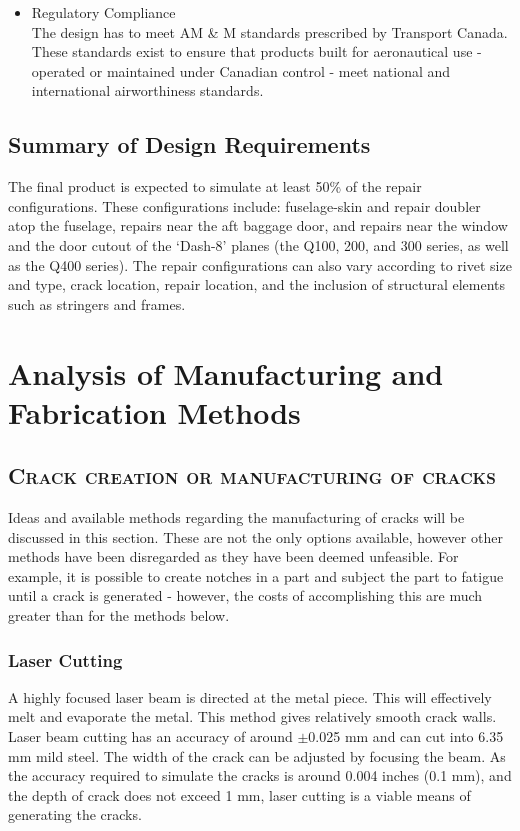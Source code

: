 \documentclass[12pt]{article}
\begin{document}
\begin{itemize}
\item Regulatory Compliance \hfill \\
The design has to meet AM \& M standards prescribed by Transport Canada. These standards exist to ensure that products built for aeronautical use - operated or maintained under Canadian control - meet national and international airworthiness standards.

\end{itemize}
\subsection{Summary of Design Requirements}

The final product is expected to simulate at least 50\% of the repair configurations. These configurations include: fuselage-skin and repair doubler atop the fuselage, repairs near the aft baggage door, and repairs near the window and the door cutout of the `Dash-8' planes (the Q100, 200, and 300 series, as well as the Q400 series). The repair configurations can also vary according to rivet size and type, crack location, repair location, and the inclusion of structural elements such as stringers and frames. 
\newpage
\section{Analysis of Manufacturing and Fabrication Methods}
\subsection{\textsc{Crack creation or manufacturing of cracks}}

Ideas and available methods regarding the manufacturing of cracks will be discussed in this section. These are not the only options available, however other methods have been disregarded as they have been deemed unfeasible. For example, it is possible to create notches in a part and subject the part to fatigue until a crack is generated - however, the costs of accomplishing this are much greater than for the methods below.

\subsubsection{Laser Cutting}
A highly focused laser beam is directed at the metal piece. This will effectively melt and evaporate the metal. This method gives relatively smooth crack walls. Laser beam cutting has an accuracy of around $\pm$0.025 mm and can cut into 6.35 mm mild steel. The width of the crack can be adjusted by focusing the beam. As the accuracy required to simulate the cracks is around 0.004 inches (0.1 mm), and the depth of crack does not exceed 1 mm, laser cutting is a viable means of generating the cracks.
\end{document}
